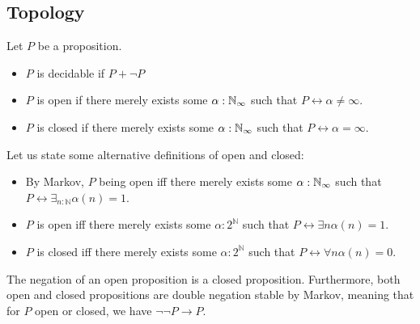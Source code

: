 \documentclass{../util/zariski-small}
\begin{document}
\subsection{Topology}
\begin{definition}
  Let $P$ be a proposition. 
  \begin{itemize}
    \item $P$ is decidable if $P + \neg P$
    \item $P$ is open if there merely exists some $\alpha:\mathbb{N}_{\infty}$ such that $P \leftrightarrow \alpha \neq \infty$. 
    \item $P$ is closed if there merely exists some $\alpha:\mathbb{N}_{\infty}$ such that $P \leftrightarrow \alpha = \infty$. 
  \end{itemize}
\end{definition}

\begin{remark}
  Let us state some alternative definitions of open and closed:
  \begin{itemize}
    \item 
      By Markov, $P$ being open iff there merely exists some $\alpha:\mathbb{N}_{\infty}$ such that 
      $P\leftrightarrow \exists_{n:\mathbb N} \alpha(n) = 1$. 
    \item 
      $P$ is open iff there merely exists some $\alpha:2^\mathbb N$ such that $P\leftrightarrow \exists n \alpha(n) = 1$.
    \item 
      $P$ is closed iff there merely exists some $\alpha:2^\mathbb N$ such that $P\leftrightarrow \forall n \alpha(n) = 0$.
\end{itemize}
\end{remark}

\begin{remark}\label{rmkOpenClosedNegation}
  The negation of an open proposition is a closed proposition.
  Furthermore, both open and closed propositions are double negation stable by Markov, 
  meaning that for $P$ open or closed, we have $\neg \neg P \to P$.
\end{remark}
\end{document}
